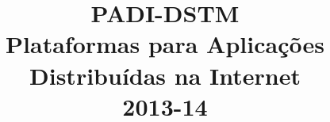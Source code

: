 \documentclass[times, 10pt,twocolumn]{article}
\begin{document}
\title{\huge{PADI-DSTM} \\[0,1in] \textmd{Plataformas para Aplicações Distribuídas na Internet \\[0,05in] 2013-14}}

\maketitle
\thispagestyle{empty}

\begin{abstract}

\end{abstract}









\nocite{ex1}


\end{document}
